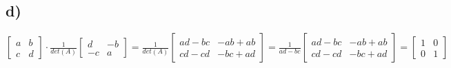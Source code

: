 \documentclass{article}
\begin{document}
\subsection*{d) }
				$
				\begin{bmatrix}
    			a  & b \\
    			c  & d
    			\end{bmatrix}  
    			\cdot
    			\frac{1}{det(A)}
    			\begin{bmatrix}
    			d  & -b \\
    			-c & a
    			\end{bmatrix}
    			=
    			\frac{1}{det(A)}
    			\begin{bmatrix}
    			ad - bc  & -ab + ab \\
    			cd - cd  & -bc + ad
    			\end{bmatrix} 
    			=
    			\frac{1}{ad-bc}
    			\begin{bmatrix}
    			ad - bc  & -ab + ab \\
    			cd - cd  & -bc + ad
    			\end{bmatrix} 
    			=
    			\begin{bmatrix}
    			1 & 0 \\
    			0 & 1
    			\end{bmatrix} 
    			$
\end{document}
